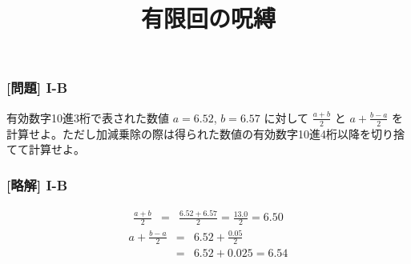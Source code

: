 \documentclass[dvipdfmx,aspectratio=169,20pt]{beamer}
\begin{document}
\graphicspath{{figs/}}

\begin{frame}
\frametitle{[問題] I-B}
有効数字10進3桁で表された数値 $a=6.52$, $b=6.57$ に対して $\frac{a+b}{2}$ と $a+\frac{b-a}{2}$ を計算せよ。ただし加減乗除の際は得られた数値の有効数字10進4桁以降を切り捨てて計算せよ。
\end{frame}

\begin{frame}
\frametitle{[略解] I-B}
\vspace{-1cm}
\begin{eqnarray*}
    \frac{a+b}{2}
    &=&\frac{6.52+6.57}{2}=\frac{13.0}{2}=6.50
\end{eqnarray*}
\begin{eqnarray*}
    a+\frac{b-a}{2}
    &=&6.52+\frac{0.05}{2}\\
    &=&6.52+0.025=6.54
\end{eqnarray*}
\end{frame}

\title{有限回の呪縛}

\end{document}

